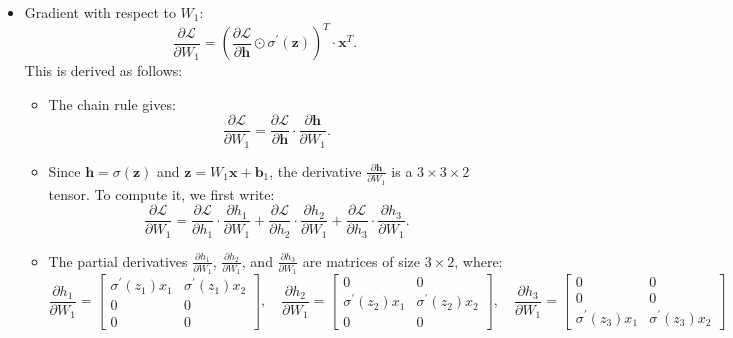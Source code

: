 \begin{notechapter}
\begin{itemize}
    \item Gradient with respect to \( W_1 \):
    \[
    \frac{\partial \mathcal{L}}{\partial W_1} = 
    \left( \frac{\partial \mathcal{L}}{\partial \mathbf{h}} 
    \odot \sigma^{\prime}(\mathbf{z}) \right)^T \cdot \mathbf{x}^T.
    \]
    This is derived as follows:
    \begin{itemize}
        \item The chain rule gives:
        \[
        \frac{\partial \mathcal{L}}{\partial W_1} = 
        \frac{\partial \mathcal{L}}{\partial \mathbf{h}} 
        \cdot \frac{\partial \mathbf{h}}{\partial W_1}.
        \]
        \item Since \( \mathbf{h} = \sigma(\mathbf{z}) \) and 
        \( \mathbf{z} = W_1 \mathbf{x} + \mathbf{b}_1 \), the 
        derivative \( \frac{\partial \mathbf{h}}{\partial W_1} \) is a 
        \( 3 \times 3 \times 2 \) tensor. To compute it, we first write:
        \[
        \frac{\partial \mathcal{L}}{\partial W_1} = 
        \frac{\partial \mathcal{L}}{\partial h_1} \cdot 
        \frac{\partial h_1}{\partial W_1} + 
        \frac{\partial \mathcal{L}}{\partial h_2} \cdot 
        \frac{\partial h_2}{\partial W_1} + 
        \frac{\partial \mathcal{L}}{\partial h_3} \cdot 
        \frac{\partial h_3}{\partial W_1}.
        \]
        \item The partial derivatives \( \frac{\partial h_1}{\partial W_1} \), 
        \( \frac{\partial h_2}{\partial W_1} \), and \( \frac{\partial h_3}{\partial W_1} \) 
        are matrices of size \( 3 \times 2 \), where:
        \[
        \frac{\partial h_1}{\partial W_1} = 
        \begin{bmatrix}
        \sigma^{\prime}(z_1) x_1 & \sigma^{\prime}(z_1) x_2 \\
        0 & 0 \\
        0 & 0
        \end{bmatrix}, \quad
        \frac{\partial h_2}{\partial W_1} = 
        \begin{bmatrix}
        0 & 0 \\
        \sigma^{\prime}(z_2) x_1 & \sigma^{\prime}(z_2) x_2 \\
        0 & 0
        \end{bmatrix}, \quad
        \frac{\partial h_3}{\partial W_1} = 
        \begin{bmatrix}
        0 & 0 \\
        0 & 0 \\
        \sigma^{\prime}(z_3) x_1 & \sigma^{\prime}(z_3) x_2

\end{bmatrix}\]
\end{itemize}
\end{itemize}
\end{notechapter}
